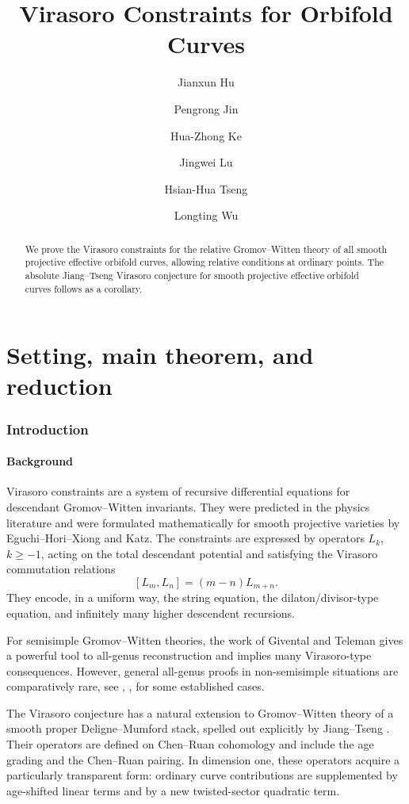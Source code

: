 \documentclass[letterpaper,12pt]{amsart}
\title[Virasoro Constraints for Orbifold Curves]
{Virasoro Constraints for Orbifold Curves}
\author[Hu]{Jianxun Hu}
\author[Jin]{Pengrong Jin}
\author[Ke]{Hua-Zhong Ke}
\author[Lu]{Jingwei Lu}
\author[Tseng]{Hsian-Hua Tseng}
\author[Wu]{Longting Wu}
\date{}
\theoremstyle{definition}
\numberwithin{equation}{section}
\begin{document}
\begin{abstract}
We prove the Virasoro constraints for the relative Gromov--Witten theory of all smooth projective effective orbifold curves, allowing relative conditions at ordinary points. The absolute Jiang--Tseng Virasoro conjecture for smooth projective effective orbifold curves follows as a corollary.
\end{abstract}

\maketitle

\begingroup
\small
\tableofcontents
\endgroup

{\large \part{Setting, main theorem, and reduction}}

\section{Introduction}
\label{sec:introduction}

\subsection{Background}
Virasoro constraints are a system of recursive differential equations for descendant Gromov--Witten invariants.  They were predicted in the physics literature and were formulated mathematically for smooth projective varieties by Eguchi--Hori--Xiong and Katz. The constraints are expressed by operators \(L_k\), \(k\ge -1\), acting on the total descendant potential and satisfying the Virasoro commutation relations
\[
   [L_m,L_n]=(m-n)L_{m+n}.
\]
They encode, in a uniform way, the string equation, the dilaton/divisor-type equation, and infinitely many higher descendent recursions.

For semisimple Gromov--Witten theories, the work of Givental \cite{Giv5} \cite{Giv6} and Teleman \cite{Tel} gives a powerful tool to all-genus reconstruction and implies many Virasoro-type consequences.  However, general all-genus proofs in non-semisimple situations are comparatively rare, see \cite{OP3}, \cite{CGT}, \cite{Tseng26} for some established cases. 

The Virasoro conjecture has a natural extension to Gromov--Witten theory of a smooth proper Deligne--Mumford stack, spelled out explicitly by Jiang--Tseng \cite{JT}.  Their operators are defined on Chen--Ruan cohomology and include the age grading and the Chen--Ruan pairing.  In dimension one, these operators acquire a particularly transparent form: ordinary curve contributions are supplemented by age-shifted linear terms and by a new twisted-sector quadratic term.  
\end{document}
